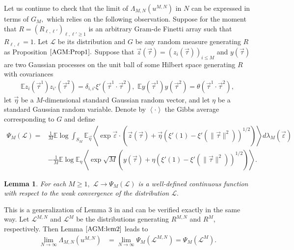 \documentclass[12pt]{article}
\newcommand{\veps}{\vec{\varepsilon}}
\newcommand{\vtau}{\vec{\tau}}
\newcommand{\veta}{\vec{\eta}}
\newcommand{\vz}{\vec{z}}
\newtheorem{lemma}{\bf Lemma}
\newenvironment{Proof of lemma}{\noindent{\bf Proof of Lemma}}{\hfill$\Box$\newline}
\newenvironment{Proof of theorem}{\noindent{\bf Proof of Theorem}}{\hfill{\footnotesize${\square}$}\newline}
\newenvironment{Proof of theorems}{\noindent{\bf Proof of Theorems}}{\hfill$\Box$\newline}
\newenvironment{Proof of proposition}{\noindent{\bf Proof of Proposition}}{\hfill$\Box$\newline}
\newenvironment{Proof of propositions}{\noindent{\bf Proof of Propositions}}{\hfill$\Box$\newline}
\newenvironment{Proof of exercise}{\noindent{\it Proof of Exercise:}}{\hfill$\Box$}
\numberwithin{equation}{section}
\begin{document}
Let us continue to check that the limit of $\Lambda_{M,N}(u^{M,N})$ in $N$ can be expressed in terms of $G_{M},$ which relies on the following observation. Suppose for the moment that $R=(R_{\ell,\ell'})_{\ell,\ell'\geq 1}$ is an arbitrary Gram-de Finetti array such that $R_{\ell,\ell}=1.$ Let $\mathcal{L}$ be its distribution  and $G$ be any random measure generating $R$ as Proposition $\ref{AGM:Prop1}.$ Suppose that $\vz(\vtau)=(z_i(\vtau))_{i\leq M}$ and $y(\vtau)$ are two Gaussian processes on the unit ball of some Hilbert space generating $R$ with covariances
\begin{align*}
\mathbb{E}z_i(\vtau^1)z_{i'}(\vtau^2)=\delta_{i,i'}\xi'(\vtau^1\cdot\vtau^2),\,\,\mathbb{E}y(\vtau^1)y(\vtau^2)=\theta(\vtau^1\cdot\vtau^2),
\end{align*}
let $\veta$ be a $M$-dimensional standard Gaussian random vector, and let $\eta$ be a standard Gaussian random variable. Denote by $\left<\cdot\right>$ the Gibbs average corresponding to $G$ and define
\begin{align*}
\Psi_M(\mathcal{L})=&\frac{1}{M}\mathbb{E}\log \int_{S_M}\mathbb{E}_{\veta}\left<\exp\veps\cdot(\vz (\vtau)+\veta(\xi'(1)-\xi'(\|\vtau\|^2))^{1/2})\right>d\lambda_M(\veps)\\
&-\frac{1}{M}\mathbb{E}\log \mathbb{E}_\eta\left<\exp\sqrt{M}({y}(\vtau)+\eta(\xi'(1)-\xi'(\|\vtau\|^2))^{1/2})\right>.
\end{align*}

\begin{lemma}\label{AGM:lem2}
For each $M\geq 1,$ $\mathcal{L}\rightarrow \Psi_M(\mathcal{L})$ is a well-defined continuous function with respect to the weak convergence of the distribution $\mathcal{L}.$
\end{lemma}

\smallskip

\noindent This is a generalization of Lemma 3 in \cite{Pan11:1} and can be verified exactly in the same way.  
Let $\mathcal{L}^{M,N}$ and $\mathcal{L}^M$ be the distributions generating $R^{M,N}$ and $R^M$, respectively. 
Then Lemma $\ref{AGM:lem2}$ leads to
\begin{align}\label{AGM:eq8}
\lim_{N\rightarrow\infty}\Lambda_{M,N}(u^{M,N})&=\lim_{N\rightarrow\infty}\Psi_M(\mathcal{L}^{M,N})=\Psi_M(\mathcal{L}^M).
\end{align}
\end{document}
